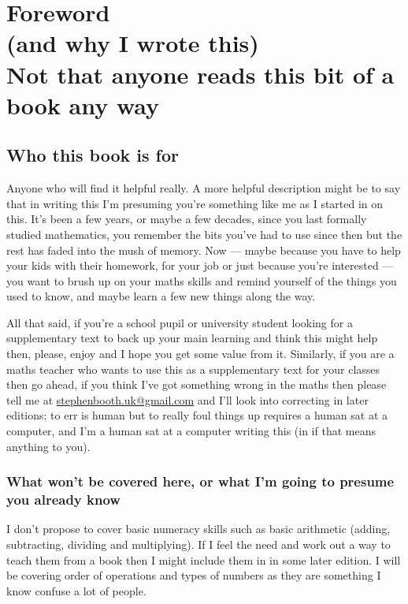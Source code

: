 \chapter[Foreword (and why I wrote this)]{Foreword \\ (and why I wrote this) \\ Not that anyone reads this bit of a book any way} \label{Foreword (and why I wrote this}
\label{Foreword}
\minitoc

\section*{Who this book is for}
Anyone who will find it helpful really.  A more helpful description might be to say that in writing this I'm presuming you're something like me as I started in on this.  It's been a few years, or maybe a few decades, since you last formally studied mathematics, you remember the bits you've had to use since then but the rest has faded into the mush of memory.  Now --- maybe because you have to help your kids with their homework, for your job or just because you're interested --- you want to brush up on your maths skills and remind yourself of the things you used to know, and maybe learn a few new things along the way.

All that said, if you're a school pupil or university student looking for a supplementary text to back up your main learning and think this might help then, please, enjoy and I hope you get some value from it.  Similarly, if you are a maths teacher who wants to use this as a supplementary text for your classes then go ahead, if you think I've got something wrong in the maths then please tell me at \href{mailto:stephenbooth.uk@gmail.com}{stephenbooth.uk@gmail.com} and I'll look into correcting in later editions; to err is human but to really foul things up requires a human sat at a computer, and I'm a human sat at a computer writing this (in \LaTeXe{} if that means anything to you).

\subsection*{What won't be covered here, or what I'm going to presume you already know}
I don't propose to cover basic numeracy skills such as basic arithmetic (adding, subtracting, dividing and multiplying).  If I feel the need and work out a way to teach them from a book then I might include them in in some later edition.  I will be covering order of operations and types of numbers as they are something I know confuse a lot of people.

